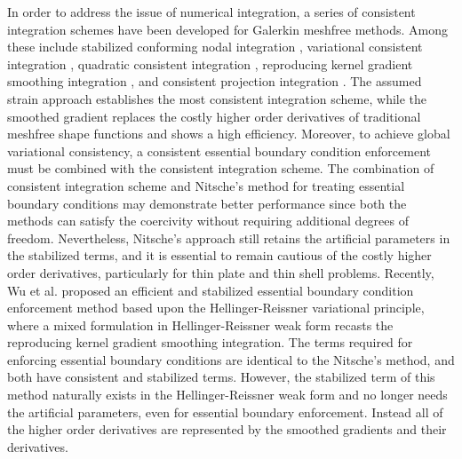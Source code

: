 In order to address the issue of numerical integration, a series of consistent integration schemes have been developed for Galerkin meshfree methods. Among these include stabilized conforming nodal integration \cite{chen2001}, variational consistent integration \cite{chen2013a}, quadratic consistent integration \cite{duan2012a}, reproducing kernel gradient smoothing integration \cite{wang2019a}, and consistent projection integration \cite{wang2023}. The assumed strain approach establishes the most consistent integration scheme, while the smoothed gradient replaces the costly higher order derivatives of traditional meshfree shape functions and shows a high efficiency. Moreover, to achieve global variational consistency, a consistent essential boundary condition enforcement must be combined with the consistent integration scheme. The combination of consistent integration scheme and Nitsche’s method for treating essential boundary conditions may demonstrate better performance since both the methods can satisfy the coercivity without requiring additional degrees of freedom. Nevertheless, Nitsche's approach still retains the artificial parameters in the stabilized terms, and it is essential to remain cautious of the costly higher order derivatives, particularly for thin plate and thin shell problems. Recently, Wu et al. \cite{wu2022a,wu2023}  proposed an efficient and stabilized essential boundary condition enforcement method based upon the Hellinger-Reissner variational principle, where a mixed formulation in Hellinger-Reissner weak form recasts the reproducing kernel gradient smoothing integration. The terms required for enforcing essential boundary conditions are identical to the Nitsche’s method, and both have consistent and stabilized terms. However, the stabilized term of this method naturally exists in the Hellinger-Reissner weak form and no longer needs the artificial parameters, even for essential boundary enforcement. Instead all of the higher order derivatives are represented by the smoothed gradients and their derivatives.

